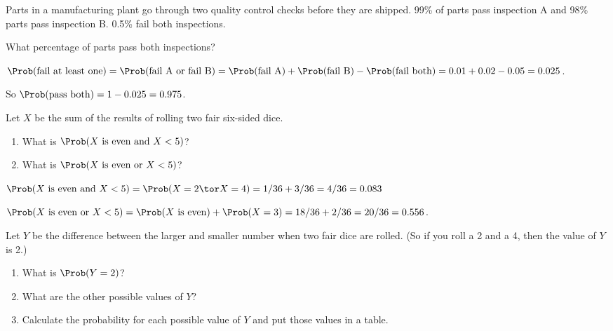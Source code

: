 \documentclass[twoside]{book}\usepackage[]{graphicx}\usepackage[]{xcolor}
\begin{document}
\begin{problem}
Parts in a manufacturing plant go through two quality control checks before they
are shipped.  99\% of parts pass inspection A and 98\% parts pass inspection B.
0.5\% fail both inspections.  

What percentage of parts pass both inspections?
\end{problem}

\begin{solution}
	$\Prob(\mbox{fail at least one}) = \Prob(\mbox{fail A or fail B}) =
	\Prob(\mbox{fail A}) + \Prob(\mbox{fail B}) - \Prob(\mbox{fail both})
	= 0.01 + 0.02 - 0.05 = 0.025$.

	So $\Prob(\mbox{pass both}) = 1 - 0.025 = 0.975$.
\end{solution}

\begin{problem} 
	Let $X$ be the sum of the results of rolling two fair six-sided dice.
	\begin{enumerate}
		\item
			What is $\Prob(\mbox{$X$ is even and $X < 5$})$?
		\item
			What is $\Prob(\mbox{$X$ is even or $X < 5$})$? 
	\end{enumerate}
\end{problem}

\begin{solution}
	$\Prob(\mbox{$X$ is even and $X < 5$}) 
	= \Prob(X = 2 \tor X = 4) = 1/36 + 3/36 = 4/36 = 0.083$

$\Prob(\mbox{$X$ is even or $X < 5$}) = \Prob(\mbox{$X$ is even}) + \Prob(X = 3)
= 18/36 + 2/36 = 20/36 = 0.556$.
\end{solution}

\begin{problem}
Let $Y$ be the difference between the larger and smaller number when two fair dice 
are rolled.  (So if you roll a 2 and a 4, then the value of $Y$ is 2.)  
\begin{enumerate}
	\item 
		What is $\Prob(Y = 2)$?
	\item
		What are the other possible values of $Y$?
	\item 
		Calculate the probability for each possible value of $Y$
		and put those values in a table.
\end{enumerate}
\end{problem}
\end{document}
